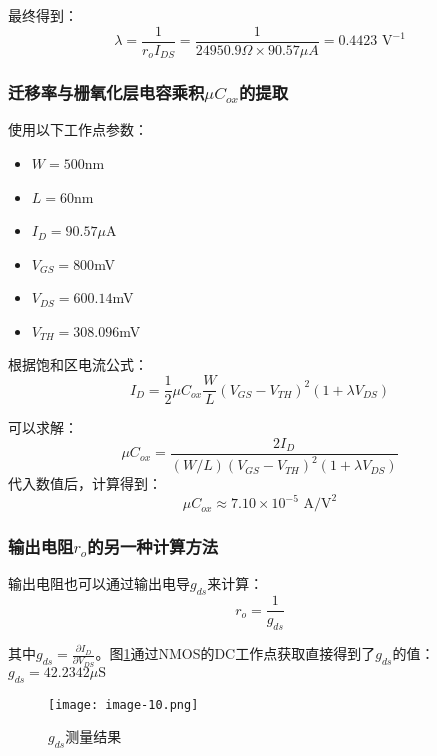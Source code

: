 \documentclass[UTF8,12pt,a4paper]{ctexart}
\begin{document}
最终得到：
\begin{equation}
\lambda = \frac{1}{r_o I_{DS}} = \frac{1}{24950.9\Omega \times 90.57\mu A} = 0.4423\text{ V}^{-1}
\end{equation}

\subsubsection{迁移率与栅氧化层电容乘积$\mu C_{ox}$的提取}

使用以下工作点参数：
\begin{itemize}
\item $W = 500$nm
\item $L = 60$nm
\item $I_D = 90.57\mu$A
\item $V_{GS} = 800$mV
\item $V_{DS} = 600.14$mV
\item $V_{TH} = 308.096$mV
\end{itemize}

根据饱和区电流公式：
\begin{equation}
I_D = \frac{1}{2}\mu C_{ox}\frac{W}{L}(V_{GS}-V_{TH})^2(1+\lambda V_{DS})
\end{equation}

可以求解：
\begin{equation}
\mu C_{ox} = \frac{2I_D}{(W/L)(V_{GS}-V_{TH})^2(1+\lambda V_{DS})} 
\end{equation}
代入数值后，计算得到：
\begin{equation}
\mu C_{ox} \approx 7.10 \times 10^{-5}\text{ A/V}^2
\end{equation}

\subsubsection{输出电阻$r_o$的另一种计算方法}

输出电阻也可以通过输出电导$g_{ds}$来计算：
\begin{equation}
r_o = \frac{1}{g_{ds}}
\end{equation}

其中$g_{ds} = \frac{\partial I_D}{\partial V_{DS}}$。图\ref{fig:task5h}通过NMOS的DC工作点获取直接得到了$g_{ds}$的值：$g_{ds} = 42.2342\mu\text{S}$

\begin{figure}[h]
\centering
\texttt{[image: image-10.png]}
\caption{$g_{ds}$测量结果}
\label{fig:task5h}
\end{figure}
\end{document}
